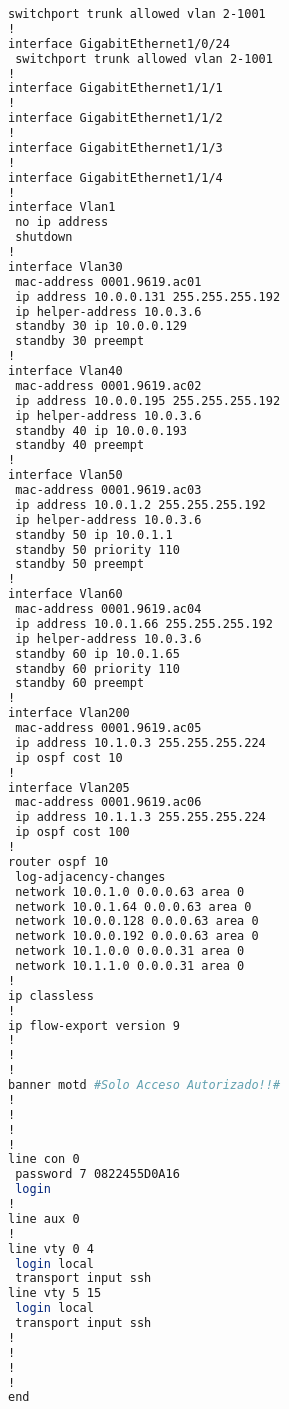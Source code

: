 \begin{lstlisting}[language=Bash, caption={Configuración Completa Switch Distribución 3}]
 switchport trunk allowed vlan 2-1001
!
interface GigabitEthernet1/0/24
 switchport trunk allowed vlan 2-1001
!
interface GigabitEthernet1/1/1
!
interface GigabitEthernet1/1/2
!
interface GigabitEthernet1/1/3
!
interface GigabitEthernet1/1/4
!
interface Vlan1
 no ip address
 shutdown
!
interface Vlan30
 mac-address 0001.9619.ac01
 ip address 10.0.0.131 255.255.255.192
 ip helper-address 10.0.3.6
 standby 30 ip 10.0.0.129
 standby 30 preempt
!
interface Vlan40
 mac-address 0001.9619.ac02
 ip address 10.0.0.195 255.255.255.192
 ip helper-address 10.0.3.6
 standby 40 ip 10.0.0.193
 standby 40 preempt
!
interface Vlan50
 mac-address 0001.9619.ac03
 ip address 10.0.1.2 255.255.255.192
 ip helper-address 10.0.3.6
 standby 50 ip 10.0.1.1
 standby 50 priority 110
 standby 50 preempt
!
interface Vlan60
 mac-address 0001.9619.ac04
 ip address 10.0.1.66 255.255.255.192
 ip helper-address 10.0.3.6
 standby 60 ip 10.0.1.65
 standby 60 priority 110
 standby 60 preempt
!
interface Vlan200
 mac-address 0001.9619.ac05
 ip address 10.1.0.3 255.255.255.224
 ip ospf cost 10
!
interface Vlan205
 mac-address 0001.9619.ac06
 ip address 10.1.1.3 255.255.255.224
 ip ospf cost 100
!
router ospf 10
 log-adjacency-changes
 network 10.0.1.0 0.0.0.63 area 0
 network 10.0.1.64 0.0.0.63 area 0
 network 10.0.0.128 0.0.0.63 area 0
 network 10.0.0.192 0.0.0.63 area 0
 network 10.1.0.0 0.0.0.31 area 0
 network 10.1.1.0 0.0.0.31 area 0
!
ip classless
!
ip flow-export version 9
!
!
!
banner motd #Solo Acceso Autorizado!!#
!
!
!
!
line con 0
 password 7 0822455D0A16
 login
!
line aux 0
!
line vty 0 4
 login local
 transport input ssh
line vty 5 15
 login local
 transport input ssh
!
!
!
!
end
\end{lstlisting}
